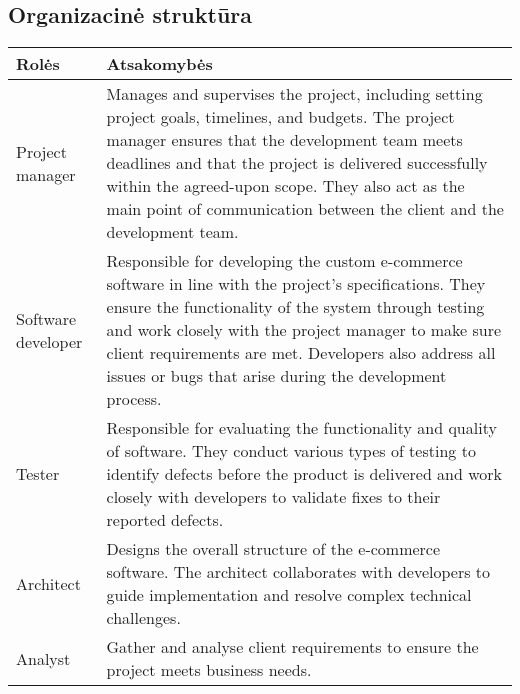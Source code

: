 \subsection{Organizacinė struktūra}
\begin{table}[h!]
\centering
\begin{tabular}{|l|p{}|}
\hline
\textbf{Rolės} & \textbf{Atsakomybės} \\ \hline

Project manager & Manages and supervises the project, including setting project goals, timelines, and budgets. The project manager ensures that the development team meets deadlines and that the project is delivered successfully within the agreed-upon scope. They also act as the main point of communication between the client and the development team. \\ \hline
Software developer & Responsible for developing the custom e-commerce software in line with the project's specifications. They ensure the functionality of the system through testing and work closely with the project manager to make sure client requirements are met. Developers also address all issues or bugs that arise during the development process. \\ \hline
Tester & Responsible for evaluating the functionality and quality of software. They conduct various types of testing to identify defects before the product is delivered and work closely with developers to validate fixes to their reported defects. \\ \hline
Architect & Designs the overall structure of the e-commerce software. The architect collaborates with developers to guide implementation and resolve complex technical challenges. \\ \hline
Analyst &  Gather and analyse client requirements to ensure the project meets business needs.\\ \hline


\end{tabular}
\end{table}



